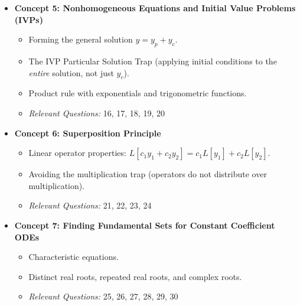 \documentclass[12pt]{article}
\begin{document}
\begin{itemize}
    \item \textbf{Concept 5: Nonhomogeneous Equations and Initial Value Problems (IVPs)}
    \begin{itemize}
        \item Forming the general solution $y = y_p + y_c$.
        \item The IVP Particular Solution Trap (applying initial conditions to the \textit{entire} solution, not just $y_c$).
        \item Product rule with exponentials and trigonometric functions.
        \item \textit{Relevant Questions:} 16, 17, 18, 19, 20
    \end{itemize}

    \item \textbf{Concept 6: Superposition Principle}
    \begin{itemize}
        \item Linear operator properties: $L[c_1y_1 + c_2y_2] = c_1L[y_1] + c_2L[y_2]$.
        \item Avoiding the multiplication trap (operators do not distribute over multiplication).
        \item \textit{Relevant Questions:} 21, 22, 23, 24
    \end{itemize}

    \item \textbf{Concept 7: Finding Fundamental Sets for Constant Coefficient ODEs}
    \begin{itemize}
        \item Characteristic equations.
        \item Distinct real roots, repeated real roots, and complex roots.
        \item \textit{Relevant Questions:} 25, 26, 27, 28, 29, 30
    \end{itemize}
\end{itemize}
\end{document}
